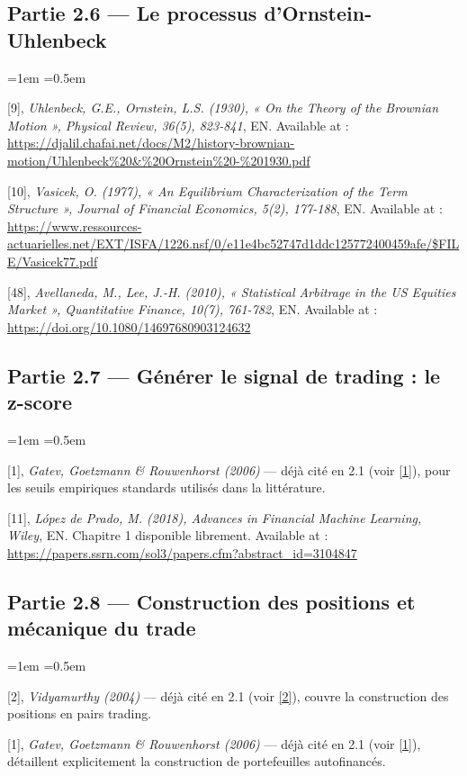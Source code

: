 \documentclass{article}
\begin{document}
\subsection*{Partie 2.6 --- Le processus d'Ornstein-Uhlenbeck}
\begin{list}{}{\leftmargin=1em \itemsep=0.5em}
\item \hypertarget{ref9}{} [9], \textit{Uhlenbeck, G.E., Ornstein, L.S. (1930), « On the Theory of the Brownian Motion », Physical Review, 36(5), 823-841}, EN. Available at : \url{https://djalil.chafai.net/docs/M2/history-brownian-motion/Uhlenbeck%20&%20Ornstein%20-%201930.pdf}
\item \hypertarget{ref10}{} [10], \textit{Vasicek, O. (1977), « An Equilibrium Characterization of the Term Structure », Journal of Financial Economics, 5(2), 177-188}, EN. Available at : \url{https://www.ressources-actuarielles.net/EXT/ISFA/1226.nsf/0/e11e4bc52747d1ddc125772400459afe/$FILE/Vasicek77.pdf}
\item \hypertarget{ref48}{} [48], \textit{Avellaneda, M., Lee, J.-H. (2010), « Statistical Arbitrage in the US Equities Market », Quantitative Finance, 10(7), 761-782}, EN. Available at : \url{https://doi.org/10.1080/14697680903124632}
\end{list}
\subsection*{Partie 2.7 --- Générer le signal de trading : le z-score}
\begin{list}{}{\leftmargin=1em \itemsep=0.5em}
\item \hypertarget{ref1}{} [1], \textit{Gatev, Goetzmann \& Rouwenhorst (2006)} --- déjà cité en 2.1 (voir \hyperlink{ref1}{[1]}), pour les seuils empiriques standards utilisés dans la littérature.
\item \hypertarget{ref11}{} [11], \textit{López de Prado, M. (2018), Advances in Financial Machine Learning, Wiley}, EN. Chapitre 1 disponible librement. Available at : \url{https://papers.ssrn.com/sol3/papers.cfm?abstract_id=3104847}
\end{list}
\subsection*{Partie 2.8 --- Construction des positions et mécanique du trade}
\begin{list}{}{\leftmargin=1em \itemsep=0.5em}
\item \hypertarget{ref2}{} [2], \textit{Vidyamurthy (2004)} --- déjà cité en 2.1 (voir \hyperlink{ref2}{[2]}), couvre la construction des positions en pairs trading.
\item \hypertarget{ref1}{} [1], \textit{Gatev, Goetzmann \& Rouwenhorst (2006)} --- déjà cité en 2.1 (voir \hyperlink{ref1}{[1]}), détaillent explicitement la construction de portefeuilles autofinancés.
\end{list}
\end{document}
